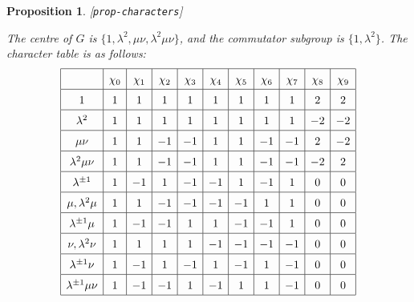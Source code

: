 \documentclass[reqno]{amsart}
\newcommand{\lbl}[1]{\label{#1}\textup{[\texttt{#1}]}\par}
\newcommand{\lbl}{\label}
\newcommand{\lm}        {\lambda}
\renewcommand{\:}{\colon}
\newtheorem{proposition}[theorem]{Proposition}
\theoremstyle{definition}
\begin{document}
\begin{proposition}\lbl{prop-characters}
 The centre of $G$ is $\{1,\lm^2,\mu\nu,\lm^2\mu\nu\}$, and the
 commutator subgroup is $\{1,\lm^2\}$.  The character table is as
 follows:
 \[ \renewcommand{\arraystretch}{1.5}
    \begin{array}{|c|c|c|c|c|c|c|c|c|c|c|} \hline
                  & \chi_0 & \chi_1 & \chi_2 & \chi_3 & \chi_4 & \chi_5 & \chi_6 & \chi_7 & \chi_8 & \chi_9 \\ \hline
                1 &  1     &  1     &  1     &  1     &  1     &  1     &  1     &  1     &  2     &  2     \\ \hline
            \lm^2 &  1     &  1     &  1     &  1     &  1     &  1     &  1     &  1     & -2     & -2     \\ \hline
           \mu\nu &  1     &  1     & -1     & -1     &  1     &  1     & -1     & -1     &  2     & -2     \\ \hline
      \lm^2\mu\nu &  1     &  1     & -1     & -1     &  1     &  1     & -1     & -1     & -2     &  2     \\ \hline
      \lm^{\pm 1} &  1     & -1     &  1     & -1     & -1     &  1     & -1     &  1     &  0     &  0     \\ \hline
     \mu,\lm^2\mu &  1     &  1     & -1     & -1     & -1     & -1     &  1     &  1     &  0     &  0     \\ \hline
   \lm^{\pm 1}\mu &  1     & -1     & -1     &  1     &  1     & -1     & -1     &  1     &  0     &  0     \\ \hline
     \nu,\lm^2\nu &  1     &  1     &  1     &  1     & -1     & -1     & -1     & -1     &  0     &  0     \\ \hline
   \lm^{\pm 1}\nu &  1     & -1     &  1     & -1     &  1     & -1     &  1     & -1     &  0     &  0     \\ \hline
\lm^{\pm 1}\mu\nu &  1     & -1     & -1     &  1     & -1     &  1     &  1     & -1     &  0     &  0     \\ \hline
   \end{array}
 \]
\end{proposition}
\end{document}
